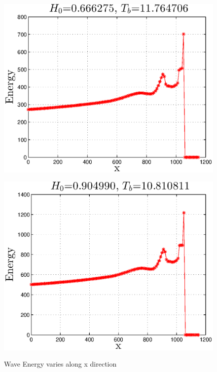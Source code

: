 
\begin{figure}[H]
\begin{minipage}[b]{0.47\linewidth}
\centering
\includegraphics[width=\textwidth]{forward_plot/p1_3.eps}
\label{Figenergy_1}
\end{minipage}
\hspace{0.2cm}
\begin{minipage}[b]{0.47\linewidth}
\centering
\includegraphics[width=\textwidth]{forward_plot/p2_3.eps}
\label{Figenergy_2}
\end{minipage}
\caption{Wave Energy varies along x direction}
\end{figure}

